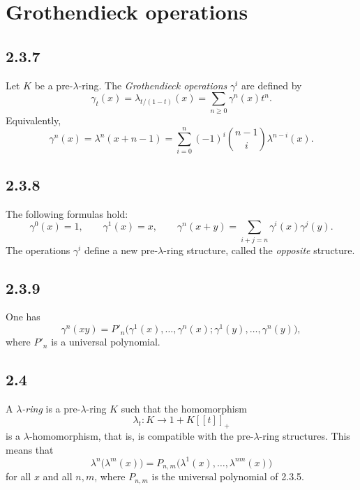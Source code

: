 \documentclass[13pt]{extarticle}
\begin{document}
\section*{Grothendieck operations}

\subsection*{2.3.7}
Let $K$ be a pre-$\lambda$-ring. The \emph{Grothendieck operations} $\gamma^i$ are defined by
\begin{equation}\label{eq:2.3.7a}
\gamma_t(x)=\lambda_{t/(1-t)}(x)=\sum_{n\geq 0}\gamma^n(x)t^n.
\end{equation}
Equivalently,
\begin{equation}\label{eq:2.3.7b}
\gamma^n(x)=\lambda^n(x+n-1)=\sum_{i=0}^{n}(-1)^i\binom{n-1}{i}\lambda^{n-i}(x).
\end{equation}

\subsection*{2.3.8}
The following formulas hold:
\begin{equation}\label{eq:2.3.8}
\gamma^0(x)=1,
\qquad
\gamma^1(x)=x,
\qquad
\gamma^n(x+y)=\sum_{i+j=n}\gamma^i(x)\gamma^j(y).
\end{equation}
The operations $\gamma^i$ define a new pre-$\lambda$-ring structure, called the \emph{opposite} structure.

\subsection*{2.3.9}
One has
\begin{equation}\label{eq:2.3.9}
\gamma^n(xy)=P'_n\bigl(\gamma^1(x),\ldots,\gamma^n(x);\gamma^1(y),\ldots,\gamma^n(y)\bigr),
\end{equation}
where $P'_n$ is a universal polynomial.

\subsection*{2.4}
A \emph{$\lambda$-ring} is a pre-$\lambda$-ring $K$ such that the homomorphism
\[
\lambda_t:K\longrightarrow 1+K[[t]]_+
\]
is a $\lambda$-homomorphism, that is, is compatible with the pre-$\lambda$-ring structures. This means that
\begin{equation}\label{eq:2.4}
\lambda^n\bigl(\lambda^m(x)\bigr)=P_{n,m}\bigl(\lambda^1(x),\ldots,\lambda^{nm}(x)\bigr)
\end{equation}
for all $x$ and all $n,m$, where $P_{n,m}$ is the universal polynomial of 2.3.5.
\end{document}
